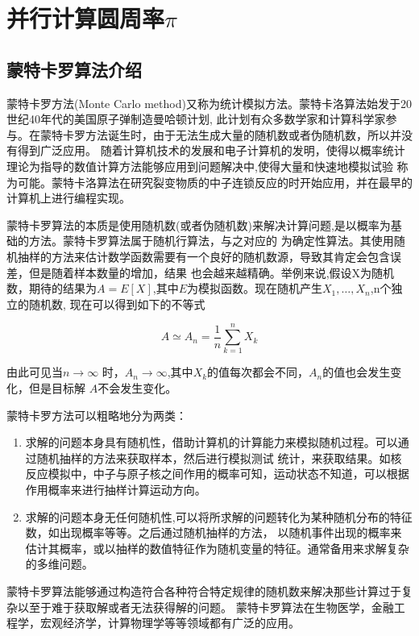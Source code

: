 
\chapter[并行计算圆周率]{并行计算圆周率$\pi$}
\section{蒙特卡罗算法介绍}
    蒙特卡罗方法(Monte Carlo method)又称为统计模拟方法。蒙特卡洛算法始发于20世纪40年代的美国原子弹制造曼哈顿计划,
此计划有众多数学家和计算科学家参与。在蒙特卡罗方法诞生时，由于无法生成大量的随机数或者伪随机数，所以并没有得到广泛应用。
随着计算机技术的发展和电子计算机的发明，使得以概率统计理论为指导的数值计算方法能够应用到问题解决中,使得大量和快速地模拟试验
称为可能。蒙特卡洛算法在研究裂变物质的中子连锁反应的时开始应用，并在最早的计算机上进行编程实现。

    蒙特卡罗算法的本质是使用随机数(或者伪随机数)来解决计算问题,是以概率为基础的方法。蒙特卡罗算法属于随机行算法，与之对应的
为确定性算法。其使用随机抽样的方法来估计数学函数需要有一个良好的随机数源，导致其肯定会包含误差，但是随着样本数量的增加，结果
也会越来越精确。举例来说,假设X为随机数，期待的结果为$A=E[X]$,其中$E$为模拟函数。现在随机产生$X_1,\ldots,X_n$,n个独立的随机数,
现在可以得到如下的不等式

    $$ A \simeq A_n = \frac{1}{n} \sum_{k=1}^{n}X_k $$
    
    由此可见当$n \rightarrow \infty$ 时，$A_n \rightarrow \infty$,其中$X_k$的值每次都会不同，$A_n$的值也会发生变化，但是目标解
$A$不会发生变化。

    蒙特卡罗方法可以粗略地分为两类：
    \begin{enumerate}
    \item 求解的问题本身具有随机性，借助计算机的计算能力来模拟随机过程。可以通过随机抽样的方法来获取样本，然后进行模拟测试
统计，来获取结果。如核反应模拟中，中子与原子核之间作用的概率可知，运动状态不知道，可以根据作用概率来进行抽样计算运动方向。
    \item 求解的问题本身无任何随机性,可以将所求解的问题转化为某种随机分布的特征数，如出现概率等等。之后通过随机抽样的方法，
以随机事件出现的概率来估计其概率，或以抽样的数值特征作为随机变量的特征。通常备用来求解复杂的多维问题。
    \end{enumerate}
    
    蒙特卡罗算法能够通过构造符合各种符合特定规律的随机数来解决那些计算过于复杂以至于难于获取解或者无法获得解的问题。
蒙特卡罗算法在生物医学，金融工程学，宏观经济学，计算物理学等等领域都有广泛的应用。

